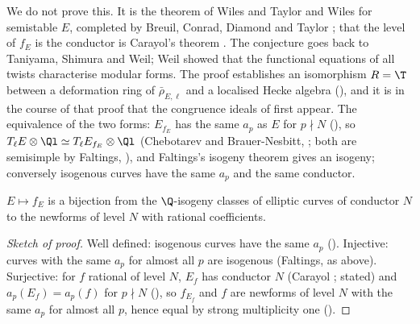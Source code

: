 We do not prove this. It is the theorem of Wiles \cite{Wiles95} and Taylor and Wiles \cite{TaylorWiles} for semistable $E$, completed by Breuil, Conrad, Diamond and Taylor
\cite{BCDT}; that the level of $f_E$ is the conductor is Carayol's theorem \cite{Carayol86}. The conjecture goes back to Taniyama, Shimura and Weil; Weil showed that the
functional equations of all twists characterise modular forms. The proof establishes an isomorphism $R=\T$ between a deformation ring of $\bar\rho_{E,\ell}$ and a localised Hecke
algebra (), and it is in the course of that proof that the congruence ideals of  first appear. The equivalence of the two forms:
$E_{f_E}$ has the same $a_p$ as $E$ for $p\nmid N$ (), so $T_\ell E\otimes\Ql\simeq T_\ell E_{f_E}\otimes\Ql$ (Chebotarev and Brauer-Nesbitt, ; both are
semisimple by Faltings, ), and Faltings's isogeny theorem gives an isogeny; conversely isogenous curves have the same $a_p$ and the same conductor.

\begin{corollary}\label{cor:moddeg:classes-and-newforms}
$E\mapsto f_E$ is a bijection from the $\Q$-isogeny classes of elliptic curves of conductor $N$ to the newforms of level $N$ with rational coefficients.
\end{corollary}

\begin{proof}[Sketch of proof]
Well defined: isogenous curves have the same $a_p$ (). Injective: curves with the same $a_p$ for almost all $p$ are isogenous (Faltings, as above). Surjective:
for $f$ rational of level $N$, $E_f$ has conductor $N$ (Carayol \cite{Carayol86}; stated) and $a_p(E_f)=a_p(f)$ for $p\nmid N$ (), so $f_{E_f}$ and $f$ are
newforms of level $N$ with the same $a_p$ for almost all $p$, hence equal by strong multiplicity one ().
\end{proof}

